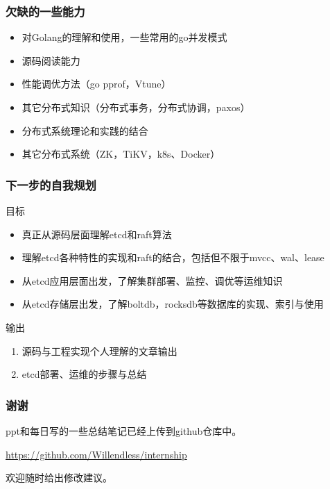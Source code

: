\documentclass{beamer}
\begin{document}
%
%

\begin{frame}
\frametitle{欠缺的一些能力}

\begin{itemize}
    \item 对Golang的理解和使用，一些常用的go并发模式
    \item 源码阅读能力
    \item 性能调优方法（go pprof，Vtune）
    \item 其它分布式知识（分布式事务，分布式协调，paxos）
    \item 分布式系统理论和实践的结合
    \item 其它分布式系统（ZK，TiKV，k8s、Docker）
\end{itemize}

\end{frame}

%
%

\begin{frame}
\frametitle{下一步的自我规划}

目标

\begin{itemize}
    \item 真正从源码层面理解etcd和raft算法
    \item 理解etcd各种特性的实现和raft的结合，包括但不限于mvcc、wal、lease
    \item 从etcd应用层面出发，了解集群部署、监控、调优等运维知识
    \item 从etcd存储层出发，了解boltdb，rocksdb等数据库的实现、索引与使用
\end{itemize}

输出

\begin{enumerate}
    \item 源码与工程实现个人理解的文章输出
    \item etcd部署、运维的步骤与总结
\end{enumerate}


\end{frame}

%
%

\begin{frame}
\frametitle{谢谢}

ppt和每日写的一些总结笔记已经上传到github仓库中。

\url{https://github.com/Willendless/internship}

欢迎随时给出修改建议。

\end{frame}
\end{document}
